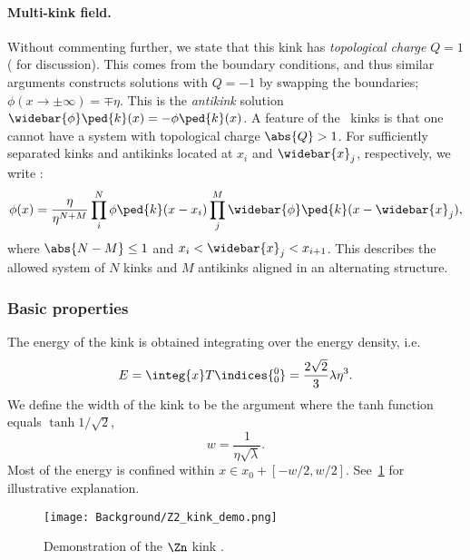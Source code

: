     \paragraph{Multi-kink field.} %
    Without commenting further, we state that this kink has \emph{topological charge} $Q=1$ (\citet[see][Ch.~1]{vachaspatiKinksDomainWalls2006} for discussion). This comes from the boundary conditions, and thus similar arguments constructs solutions with $Q=-1$ by swapping the boundaries; $\phi(x\to \pm \infty) = \mp \eta$. This is the \emph{antikink} solution $\widebar{\phi}\ped{k}(x)=- \phi\ped{k}(x)$. A feature of the \Zn~kinks is that one cannot have a system with topological charge $\abs{Q}>1$. For sufficiently separated kinks and antikinks located at $x_i$ and $\widebar{x}_j$, respectively, we write \citep{vachaspatiKinksDomainWalls2006}:
    \begin{equation}\label{eq:cosmo:defects:many_kinks}
        \phi(x) = \frac{\eta}{\eta^{N+M}} \prod_{i}^{N} \phi\ped{k}(x-x_i) \prod_{j}^{M} \widebar{\phi}\ped{k}(x-\widebar{x}_j),
    \end{equation}
    where $\abs{N-M}\leq 1$ and $x_i < \widebar{x}_j < x_{i+1}$. This describes the allowed system of $N$ kinks and $M$ antikinks aligned in an alternating structure.


    \subsubsection{Basic properties}

        The energy of the kink is obtained integrating over the energy density, i.e.%
        \begin{equation}\label{eq:cosmo:defects:energy_of_Z2_kink}
            E = \integ{x} T\indices{^0_0} = \frac{2\sqrt{2 }}{3} \lambda \eta^3.
        \end{equation}
        We define the width of the kink to be the argument where the tanh function equals $\tanh{1/\sqrt{2}}$,
        \begin{equation}
            w = \frac{1}{\eta\sqrt{\lambda}}.
        \end{equation}
        Most of the energy is confined within $x \in x_0 +[-w/2, w/2]$. See~\cref{fig:cosmo:defects:Z2_kink_demo} for illustrative explanation.
        \begin{figure}[H]\label{fig:cosmo:defects:Z2_kink_demo}
            \centering
            \texttt{[image: Background/Z2\_kink\_demo.png]}
            \caption{Demonstration of the $\Zn$ kink \blahblah.}
        \end{figure}

